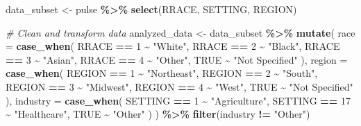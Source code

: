 \documentclass[
]{article}
\newenvironment{Shaded}{\begin{snugshade}}{\end{snugshade}}
\newcommand{\AttributeTok}[1]{\textcolor[rgb]{0.13,0.29,0.53}{#1}}
\newcommand{\CommentTok}[1]{\textcolor[rgb]{0.56,0.35,0.01}{\textit{#1}}}
\newcommand{\ConstantTok}[1]{\textcolor[rgb]{0.56,0.35,0.01}{#1}}
\newcommand{\DecValTok}[1]{\textcolor[rgb]{0.00,0.00,0.81}{#1}}
\newcommand{\FunctionTok}[1]{\textcolor[rgb]{0.13,0.29,0.53}{\textbf{#1}}}
\newcommand{\NormalTok}[1]{#1}
\newcommand{\OtherTok}[1]{\textcolor[rgb]{0.56,0.35,0.01}{#1}}
\newcommand{\SpecialCharTok}[1]{\textcolor[rgb]{0.81,0.36,0.00}{\textbf{#1}}}
\newcommand{\StringTok}[1]{\textcolor[rgb]{0.31,0.60,0.02}{#1}}
\begin{document}
\begin{Shaded}
\begin{Highlighting}[]
\NormalTok{data\_subset }\OtherTok{\textless{}{-}}\NormalTok{ pulse }\SpecialCharTok{\%\textgreater{}\%}
  \FunctionTok{select}\NormalTok{(RRACE, SETTING, REGION)}
\end{Highlighting}
\end{Shaded}

\begin{Shaded}
\begin{Highlighting}[]
\CommentTok{\# Clean and transform data}
\NormalTok{analyzed\_data }\OtherTok{\textless{}{-}}\NormalTok{ data\_subset }\SpecialCharTok{\%\textgreater{}\%}
  \FunctionTok{mutate}\NormalTok{(}
    \AttributeTok{race =} \FunctionTok{case\_when}\NormalTok{(}
\NormalTok{      RRACE }\SpecialCharTok{==} \DecValTok{1} \SpecialCharTok{\textasciitilde{}} \StringTok{"White"}\NormalTok{,}
\NormalTok{      RRACE }\SpecialCharTok{==} \DecValTok{2} \SpecialCharTok{\textasciitilde{}} \StringTok{"Black"}\NormalTok{,}
\NormalTok{      RRACE }\SpecialCharTok{==} \DecValTok{3} \SpecialCharTok{\textasciitilde{}} \StringTok{"Asian"}\NormalTok{,}
\NormalTok{      RRACE }\SpecialCharTok{==} \DecValTok{4} \SpecialCharTok{\textasciitilde{}} \StringTok{"Other"}\NormalTok{,}
      \ConstantTok{TRUE} \SpecialCharTok{\textasciitilde{}} \StringTok{"Not Specified"}
\NormalTok{    ),}
    \AttributeTok{region =} \FunctionTok{case\_when}\NormalTok{(}
\NormalTok{      REGION }\SpecialCharTok{==} \DecValTok{1} \SpecialCharTok{\textasciitilde{}} \StringTok{"Northeast"}\NormalTok{,}
\NormalTok{      REGION }\SpecialCharTok{==} \DecValTok{2} \SpecialCharTok{\textasciitilde{}} \StringTok{"South"}\NormalTok{,}
\NormalTok{      REGION }\SpecialCharTok{==} \DecValTok{3} \SpecialCharTok{\textasciitilde{}} \StringTok{"Midwest"}\NormalTok{,}
\NormalTok{      REGION }\SpecialCharTok{==} \DecValTok{4} \SpecialCharTok{\textasciitilde{}} \StringTok{"West"}\NormalTok{,}
      \ConstantTok{TRUE} \SpecialCharTok{\textasciitilde{}} \StringTok{"Not Specified"}
\NormalTok{    ),}
    \AttributeTok{industry =} \FunctionTok{case\_when}\NormalTok{(}
\NormalTok{      SETTING }\SpecialCharTok{==} \DecValTok{1} \SpecialCharTok{\textasciitilde{}} \StringTok{"Agriculture"}\NormalTok{,}
\NormalTok{      SETTING }\SpecialCharTok{==} \DecValTok{17} \SpecialCharTok{\textasciitilde{}} \StringTok{"Healthcare"}\NormalTok{,}
      \ConstantTok{TRUE} \SpecialCharTok{\textasciitilde{}} \StringTok{"Other"}
\NormalTok{    )}
\NormalTok{  ) }\SpecialCharTok{\%\textgreater{}\%}
  \FunctionTok{filter}\NormalTok{(industry }\SpecialCharTok{!=} \StringTok{"Other"}\NormalTok{)}
\end{Highlighting}
\end{Shaded}
\end{document}
